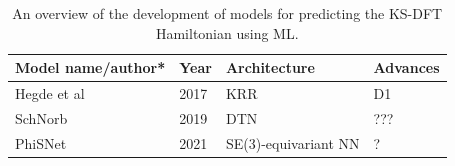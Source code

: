 \documentclass[11pt,a4paper,twoside]{report}  %
\numberwithin{equation}{section}					%
\numberwithin{figure}{section}						%
\begin{document}
\begin{table}
    \caption{An overview of the development of models for predicting the KS-DFT Hamiltonian using ML.}
    \centering
    \begin{tabular}{lllp{8cm}}     %
        \toprule                %
     \textbf{Model name/author*} & \textbf{Year} & \textbf{Architecture} & \textbf{Advances} \\      %
        \midrule
       Hegde et al\autocite{hegdeMachinelearnedApproximationsDensity2017} & 2017 & KRR & D1    \\       %

        \midrule                %
      SchNorb\autocite{schuttUnifyingMachineLearning2019} & 2019 & DTN & ??? \\       %
        \midrule
        PhiSNet\autocite{unkeSE3equivariantPredictionMolecular} & 2021 & SE(3)-equivariant NN & ? \\
        \midrule
         

\end{tabular}
\end{table}
\end{document}
